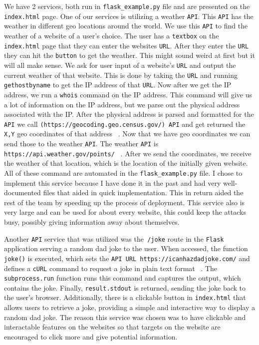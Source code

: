 We have 2 services, both run in \verb+flask_example.py+ file and are presented on the \verb+index.html+ page. One of our services is utilizing a weather \verb+API+. This \verb+API+ has the weather in different geo locations around the world. We use this \verb+API+ to find the weather of a website of a user's choice. The user has a \verb+textbox+ on the \verb+index.html+ page that they can enter the websites \verb+URL+. After they enter the \verb+URL+ they can hit the \verb+button+ to get the weather. This might sound weird at first but it will all make sense. We ask for user input of a website's \verb+URL+ and output the current weather of that website. This is done by taking the \verb+URL+ and running \verb+gethostbyname+ to get the IP address of that \verb+URL+. Now after we get the IP address, we run a \verb+whois+ command on the IP address. This command will give us a lot of information on the IP address, but we parse out the physical address associated with the IP. After the physical address is parsed and formatted for the \verb+API+ we call \verb+(https://geocoding.geo.census.gov/) API+ and get returned the \verb+X,Y+ geo coordinates of that address ~\cite{GeoLocationAPI}. Now that we have geo coordinates we can send those to the weather \verb+API+. The weather \verb+API+ is \verb+https://api.weather.gov/points/+ ~\cite{WeahterAPI}. After we send the coordinates, we receive the weather of that location, which is the location of the initially given website. All of these command are automated in the \verb+flask_example.py+ file. I chose to implement this service because I have done it in the past and had very well-documented files that aided in quick implementation. This in return aided the rest of the team by speeding up the process of deployment. This service also is very large and can be used for about every website, this could keep the attacks busy, possibly giving information away about themselves.

Another \verb+API+ service that was utilized was the\verb+ /joke+ route in the \verb+Flask+ application serving a random dad joke to the user. When accessed, the function \verb+joke()+ is executed, which sets the \verb+API URL https://icanhazdadjoke.com/+ and defines a \verb+cURL+ command to request a joke in plain text format ~\cite{DadJokesAPI}. The \verb+subprocess.run+ function runs this command and captures the output, which contains the joke. Finally,  \verb+result.stdout+ is returned, sending the joke back to the user's browser. Additionally, there is a clickable button in \verb+index.html+ that allows users to retrieve a joke, providing a simple and interactive way to display a random dad joke. The reason this service was chosen was to have clickable and interactable features on the websites so that targets on the website are encouraged to click more and give potential information.

